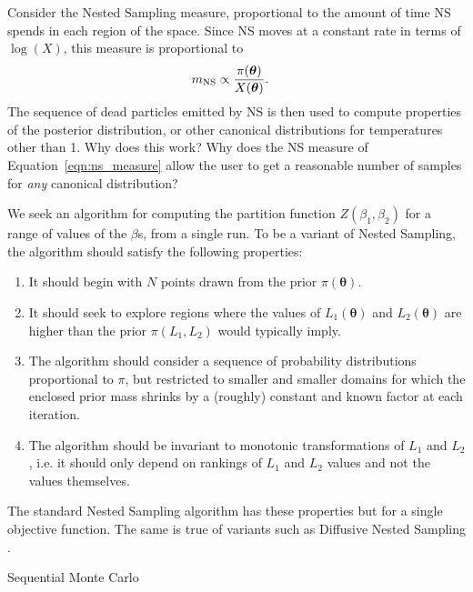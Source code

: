 \documentclass[entropy,article,submit,moreauthors,pdftex,10pt,a4paper]{Definitions/mdpi}
\newcommand{\xx}{\boldsymbol{\theta}}
\begin{document}
Consider the Nested Sampling measure, proportional to the amount of time
NS spends in each region of the space. Since NS moves at a constant rate
in terms of $\log(X)$, this measure is proportional to
\begin{align}
m_{\rm NS} &\propto \frac{\pi(\xx)}{X(\xx)}.\label{eqn:measure}
\end{align}
The sequence of dead particles emitted by NS is then used to compute properties
of the posterior distribution, or other canonical distributions for temperatures
other than 1. Why does this work? Why does the NS measure of
Equation~\ref{eqn:ns_measure} allow the user to get a reasonable number of
samples for {\em any} canonical distribution?






We seek an algorithm for computing the partition function
$Z(\beta_1, \beta_2)$ for a range of values of the $\beta$s, from a single
run. To be a variant of Nested Sampling, the algorithm should satisfy
the following properties:
\begin{enumerate}
\item It should begin with $N$ points drawn from the prior $\pi(\xx)$.
\item It should seek to explore regions where the values of
$L_1(\xx)$ and $L_2(\xx)$ are higher than the prior $\pi(L_1, L_2)$
would typically imply.
\item The algorithm should consider a sequence of probability
distributions proportional to $\pi$, but restricted to smaller and smaller
domains for which the enclosed prior mass shrinks by a (roughly) constant and
known factor at each iteration.
\item The algorithm should be invariant to monotonic transformations of
$L_1$ and $L_2$, i.e. it should only depend on rankings of $L_1$ and $L_2$
values and not the values themselves.
\end{enumerate}
The standard Nested Sampling algorithm has these properties but for a
single objective function. The same is true of variants such as
Diffusive Nested Sampling \citep{dns, dnest4}.


Sequential Monte Carlo \citep{salomone2018unbiased}
\end{document}
